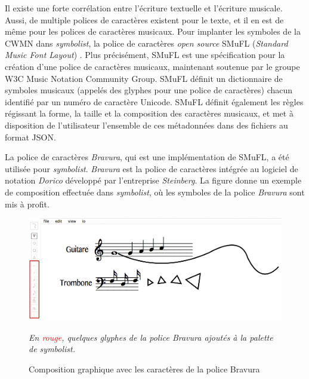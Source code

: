 Il existe une forte corrélation entre l'écriture textuelle et l'écriture musicale. Aussi, de multiple polices de caractères existent pour le texte, et il en est de même pour les polices de caractères musicaux.
Pour implanter les symboles de la CWMN dans \textit{symbolist}, la police de caractères \textit{open source} SMuFL (\textit{Standard Music Font Layout}) \cite{smufl2016}. Plus précisément, SMuFL est une spécification pour la création d'une police de caractères musicaux, maintenant soutenue par le groupe W3C Music Notation Community Group. SMuFL définit un dictionnaire de symboles musicaux (appelés des glyphes pour une police de caractères) chacun identifié par un numéro de caractère Unicode. SMuFL définit également les règles régissant la forme, la taille et la composition des caractères musicaux, et met à disposition de l'utilisateur l'ensemble de ces métadonnées dans des fichiers au format JSON.

La police de caractères \textit{Bravura}, qui est une implémentation de SMuFL, a été utilisée pour \textit{symbolist}. \textit{Bravura} est la police de caractères intégrée au logiciel de notation \textit{Dorico} développé par l'entreprise \textit{Steinberg}.
La figure donne un exemple de composition effectuée dans \textit{symbolist}, où les symboles de la police \textit{Bravura} sont mis à profit.

\begin{figure}[H]
	\centering
	\includegraphics[keepaspectratio=true, width=\textwidth]{ModeleDeNotation/i/bravuraCreation.png}
	\caption{Composition graphique avec les caractères de la police Bravura}
	\label{fig:bravuraCreation}
	\small
	\it
	En \textcolor{red}{rouge}, quelques glyphes de la police \emph{Bravura} ajoutés à la palette de \emph{symbolist}.
\end{figure}
     